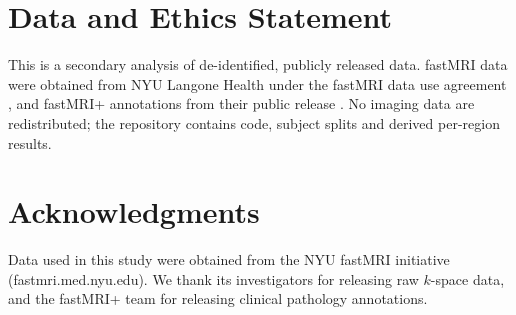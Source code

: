 \documentclass[letterpaper]{article} %
\begin{document}
\section*{Data and Ethics Statement}
This is a secondary analysis of de-identified, publicly released data. fastMRI
data were obtained from NYU Langone Health under the fastMRI data use
agreement \citep{zbontar2018fastmri,knoll2020fastmri}, and fastMRI+
annotations from their public release \citep{zhao2022fastmriplus}. No imaging
data are redistributed; the repository contains code, subject splits and
derived per-region results.

\section*{Acknowledgments}
Data used in this study were obtained from the NYU fastMRI initiative
(fastmri.med.nyu.edu). We thank its investigators for releasing raw $k$-space
data, and the fastMRI+ team for releasing clinical pathology annotations.


\end{document}
